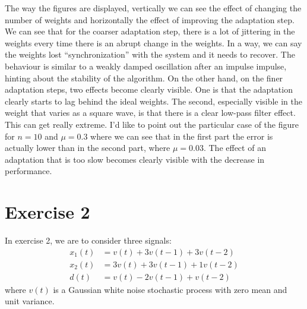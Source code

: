 The way the figures are displayed, vertically we can see the effect of changing
the number of weights and horizontally the effect of improving the adaptation
step. We can see that for the coarser adaptation step, there is a lot of jittering
in the weights every time there is an abrupt change in the weights. In a way, we
can say the weights lost ``synchronization'' with the system and it needs to
recover. The behaviour is similar to a weakly damped oscillation after an impulse
impulse, hinting about the stability of the algorithm. On the other hand, on the
finer adaptation steps, two effects become clearly visible. One is that the
adaptation clearly starts to lag behind the ideal weights. The second, especially
visible in the weight that varies as a square wave, is that there is a clear
low-pass filter effect. This can get really extreme. I'd like to point out the
particular case of the figure~\label{fig:ex1vsig3n10mu3} for \(n=10\) and
\(\mu=0.3\) where we can see that in the first part the error is actually lower
than in the second part, where \(\mu=0.03\). The effect of an adaptation that is
too slow becomes clearly visible with the decrease in performance.

\section{Exercise 2}

In exercise 2, we are to consider three signals:
\begin{align}
    x_1 (t) & = v(t) + 3v(t-1) + 3v(t-2)  \\
    x_2 (t) & = 3v(t) + 3v(t-1) + 1v(t-2) \\
    d(t)    & = v(t) - 2v(t-1) + v(t-2)
\end{align}
where \(v(t)\) is a Gaussian white noise stochastic process with zero mean and
unit variance.

